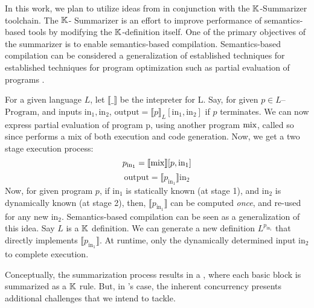 
In this work, we plan to utilize ideas from \cite{KoppelICFP22}
in conjunction with the $\mathbb{K}{}$-Summarizer toolchain. The $\mathbb{K}{}$-
Summarizer is an effort to improve performance of semantics-based tools
by modifying the $\mathbb{K}$-definition itself. One of the primary objectives
of the summarizer is to enable semantics-based compilation.
Semantics-based compilation can be considered a generalization of
established techniques for established techniques for program optimization
such as partial evaluation of programs \cite{Jones93Book}.

For a given language $L$, let $\llbracket\_\rrbracket$ be the
intepreter for L. Say, for given $p \in L$--$\text{Program}$, and inputs
$\text{in}_1, \text{in}_2$,
$\text{output} = \llbracket p \rrbracket_{L}\left[\text{in}_1,\text{in}_2\right]$
if $p$ terminates.
We can now express partial evaluation of program p, using another
program $\text{mix}$, called so since performs a mix of both execution and code
generation. Now, we get a two stage execution process:
$$ p_{\text{in}_1} = \llbracket \text{mix} \rrbracket [p, \text{in}_1]$$
$$ \text{output} = \llbracket p_{\text{in}_1} \rrbracket \text{in}_2$$
Now, for given program $p$, if $\text{in}_1$ is statically known (at stage 1),
and $\text{in}_2$ is dynamically known (at stage 2), then,
$\llbracket p_{\text{in}_1} \rrbracket$ can be computed \emph{once}, and
re-used for any new $\text{in}_2$.
Semantics-based compilation can be seen as a generalization of this idea.
Say $L$ is a $\mathbb{K}$ definition. We can generate a new definition
$L^{p_{\text{in}_1}}$ that directly implements $\llbracket p_{\text{in}_1}
\rrbracket$. At runtime, only the dynamically determined input $\text{in}_2$
to complete execution.

Conceptually, the summarization process results in a \CFG{}, where
each basic block is summarized as a $\mathbb{K}$ rule. But, in \MediK{}'s
case, the inherent concurrency presents additional challenges
that we intend to tackle.

